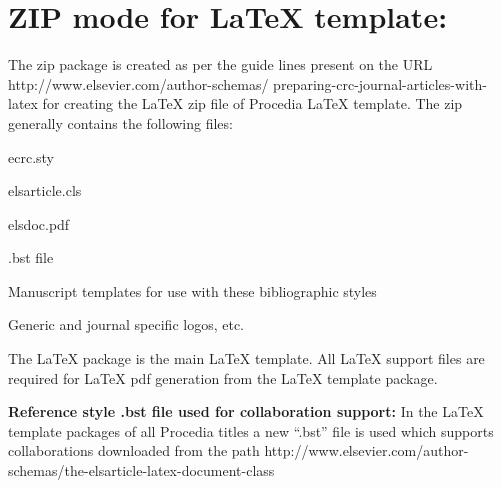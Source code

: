 \documentclass[3p,times,procedia]{elsarticle}
\begin{document}
\section{ZIP mode for LaTeX template:}

The zip package is created as per the guide lines present on the URL http://www.elsevier.com/author-schemas/ preparing-crc-journal-articles-with-latex for creating the LaTeX zip file of Procedia LaTeX template.  The zip generally contains the following files:
\begin{Itemize}[]\leftskip-17.7pt
\item ecrc.sty
\item  elsarticle.cls
\item elsdoc.pdf
\item .bst file
\item Manuscript templates for use with these bibliographic styles
\item  Generic and journal specific logos, etc.
\end{Itemize}

The LaTeX package is the main LaTeX template. All LaTeX support files are required for LaTeX pdf generation from the LaTeX template package. 

{\bf Reference style .bst file used for collaboration support:} In the LaTeX template packages of all Procedia titles a new ``.bst'' file is used which supports collaborations downloaded from the path http://www.elsevier.com/author-schemas/the-elsarticle-latex-document-class
\end{document}
